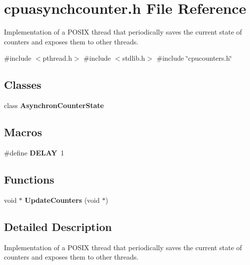 \section{cpuasynchcounter.\+h File Reference}
\label{cpuasynchcounter_8h}


Implementation of a P\+O\+S\+IX thread that periodically saves the current state of counters and exposes them to other threads.  


{\ttfamily \#include $<$pthread.\+h$>$}\newline
{\ttfamily \#include $<$stdlib.\+h$>$}\newline
{\ttfamily \#include \char`\"{}cpucounters.\+h\char`\"{}}\newline
\subsection*{Classes}
\begin{DoxyCompactItemize}
\item 
class \textbf{ Asynchron\+Counter\+State}
\end{DoxyCompactItemize}
\subsection*{Macros}
\begin{DoxyCompactItemize}
\item 
\mbox{\label{cpuasynchcounter_8h_a62249e384b997229a3e2ae74ade334e2}} 
\#define {\bfseries D\+E\+L\+AY}~1
\end{DoxyCompactItemize}
\subsection*{Functions}
\begin{DoxyCompactItemize}
\item 
\mbox{\label{cpuasynchcounter_8h_adfa97f5f86f053c95e1c725b790a3922}} 
void $\ast$ {\bfseries Update\+Counters} (void $\ast$)
\end{DoxyCompactItemize}


\subsection{Detailed Description}
Implementation of a P\+O\+S\+IX thread that periodically saves the current state of counters and exposes them to other threads. 

